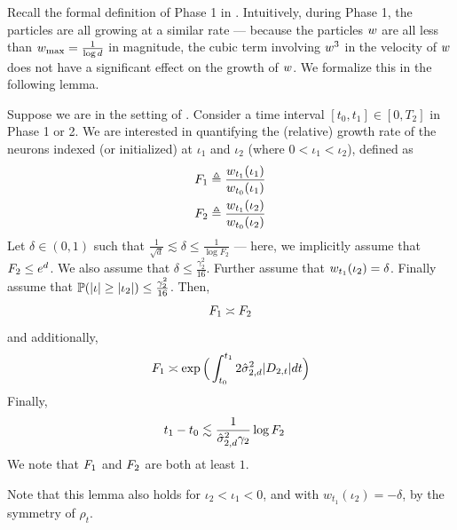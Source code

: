 Recall the formal definition of Phase 1 in . Intuitively, during Phase 1, the particles are all growing at a similar rate --- because the particles $w$ are all less than ${w_{\textup{max}}} = \frac{1}{\log d}$ in magnitude, the cubic term involving $w^3$ in the velocity of $w$ does not have a significant effect on the growth of $w$. We formalize this in the following lemma.

\begin{lemma}  \label{lemma:uniform_growth_lemma}
Suppose we are in the setting of . Consider a time interval $[t_0, t_1]\in [0, T_2]$ in Phase 1 or 2. We are interested in quantifying the (relative) growth rate of the neurons indexed (or initialized) at $\iota_1$ and $\iota_2$ (where $0 < \iota_1 < \iota_2$), defined as 
\begin{align}
    F_1 & \triangleq \frac{w_{t_1}(\iota_1)}{w_{t_0}(\iota_1)}\nonumber \\
    F_2 & \triangleq \frac{w_{t_1}(\iota_2)}{w_{t_0}(\iota_2)}\nonumber
\end{align}
Let $\delta \in (0, 1)$ such that $\frac{1}{\sqrt{d}} \lesssim \delta \leq \frac{1}{\log F_2}$ --- here, we implicitly assume that $F_2 \leq e^d$. We also assume that $\delta \leq \frac{\gamma_2^2}{16}$. Further assume that $w_{t_1}(\iota_2) = \delta$. Finally assume that $\mathbb{P}(|\iota| \geq |\iota_2|) \leq \frac{\gamma_2^2}{16}$. Then,
\begin{align} \label{eq:uniform_growth_statement_1}
F_1 \asymp F_2
\end{align}
and additionally,
\begin{align} \label{eq:first_order_growth_rate}
F_1 \asymp \exp\Big(\int_{t_0}^{t_1} 2 \hat{\sigma}_{2, d}^2 |D_{2, t}| dt \Big)
\end{align}
Finally,
\begin{align} \label{eq:uniform_growth_statement_2}
t_1 - t_0
& \lesssim \frac{1}{\hat{\sigma}_{2, d}^2 \gamma_2} \log F_2
\end{align}
We note that $F_1$ and $F_2$ are both at least $1$.
\end{lemma}
Note that this lemma also holds for $\iota_2 < \iota_1 < 0$, and with $w_{t_1} (\iota_2) = -\delta$, by the symmetry of $\rho_t$.

